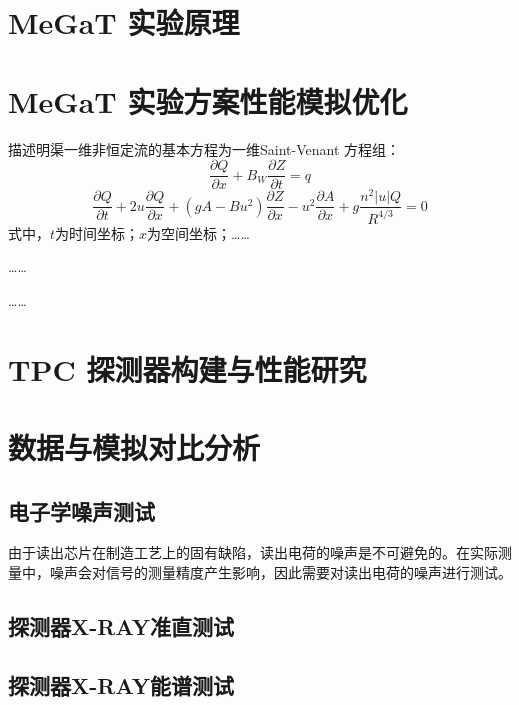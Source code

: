 \section{MeGaT 实验原理}


\section{MeGaT 实验方案性能模拟优化}
描述明渠一维非恒定流的基本方程为一维Saint-Venant 方程组：
\begin{equation}
	\frac{\partial Q}{\partial x}+B_{W}\frac{\partial Z}{\partial t}=q
\end{equation}
\begin{equation}
	\frac{\partial Q}{\partial t}+2u\frac{\partial Q}{\partial x}+(gA-Bu^{2})\frac{\partial Z}{\partial x}-u^{2}\frac{\partial A}{\partial x}+g\frac{n^{2} |u|Q}{R^{4/3}}=0
\end{equation}
\noindent 式中，$t$为时间坐标；$x$为空间坐标；……\par
……\par
……

\section{ TPC 探测器构建与性能研究}


\section{数据与模拟对比分析}
\subsection{电子学噪声测试}
由于读出芯片在制造工艺上的固有缺陷，读出电荷的噪声是不可避免的。在实际测量中，噪声会对信号的测量精度产生影响，因此需要对读出电荷的噪声进行测试。\par


\subsection{探测器X-RAY准直测试}


\subsection{探测器X-RAY能谱测试}


\subsection{}



